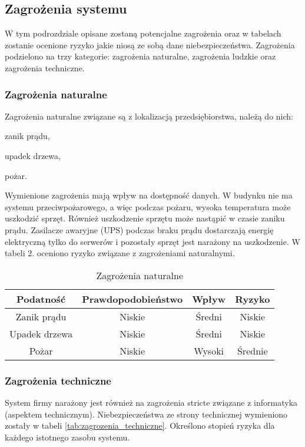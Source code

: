 \subsection{Zagrożenia systemu}
W tym podrozdziale opisane zostaną potencjalne zagrożenia oraz w tabelach zostanie ocenione ryzyko jakie niosą ze sobą dane niebezpieczeństwa. Zagrożenia podzielono na trzy kategorie: zagrożenia naturalne, zagrożenia ludzkie oraz zagrożenia techniczne.

\subsubsection{Zagrożenia naturalne} 
Zagrożenia naturalne związane są z lokalizacją przedsiębiorstwa, należą do nich:
\begin{itemize*}
	\item zanik prądu,
	\item upadek drzewa,
	\item pożar.
\end{itemize*}

Wymienione zagrożenia mają wpływ na dostępność danych. W budynku nie ma systemu przeciwpożarowego, a więc podczas pożaru, wysoka temperatura może uszkodzić sprzęt. Również uszkodzenie sprzętu może nastąpić w czasie zaniku prądu. Zasilacze awaryjne (UPS) podczas braku prądu dostarczają energię elektryczną tylko do serwerów i pozostały sprzęt jest narażony na uszkodzenie. W tabeli 2. oceniono ryzyko związane z zagrożeniami naturalnymi.
\begin{table}[!ht]
	\centering
	\caption{Zagrożenia naturalne}
	\label{zagrożeniaNaturalne}
	\begin{tabular}{|c|c|c|c|}
		\hline
		\textbf{Podatność} & \textbf{Prawdopodobieństwo} & \textbf{Wpływ} & \textbf{Ryzyko} \\ \hline
		Zanik prądu        & Niskie                      & Średni         & Niskie          \\ \hline
		Upadek drzewa      & Niskie                      & Średni         & Niskie          \\ \hline
		Pożar              & Niskie                      & Wysoki        & Średnie         \\ \hline
	\end{tabular}
\end{table}

\subsubsection{Zagrożenia techniczne}
System firmy narażony jest również na zagrożenia stricte związane z informatyka (aspektem technicznym). Niebezpieczeństwa ze strony technicznej wymieniono zostały w tabeli  \ref{tab:zagrozenia_techniczne}. Określono stopień ryzyka dla każdego istotnego zasobu systemu.

